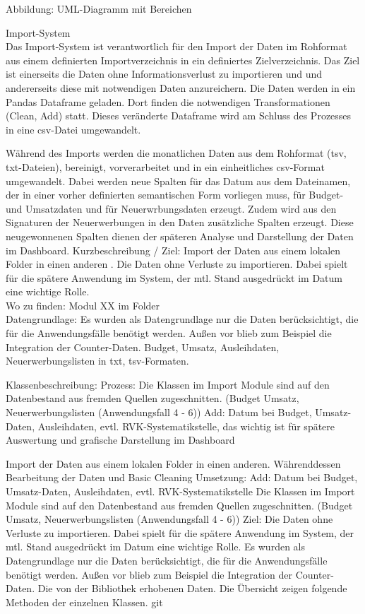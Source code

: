     Abbildung: UML-Diagramm mit Bereichen
    
    
    Import-System\\
    Das Import-System ist verantwortlich für den Import der Daten im Rohformat aus einem definierten Importverzeichnis in ein definiertes Zielverzeichnis. Das Ziel
    ist einerseits die Daten ohne Informationsverlust zu importieren und und andererseits diese mit notwendigen Daten anzureichern. Die Daten werden in ein Pandas Dataframe
    geladen. Dort finden die notwendigen Transformationen (Clean, Add) statt. Dieses veränderte Dataframe wird am Schluss des Prozesses in eine csv-Datei umgewandelt.
    
    
    Während des Imports werden 
    die monatlichen Daten aus dem Rohformat (tsv, txt-Dateien), bereinigt, vorverarbeitet und in ein einheitliches csv-Format umgewandelt. Dabei werden neue Spalten für das Datum aus dem Dateinamen, der in einer vorher definierten semantischen Form vorliegen muss, für Budget- und Umsatzdaten und für Neuerwrbungsdaten erzeugt. Zudem wird aus den Signaturen der Neuerwerbungen in den Daten zusätzliche Spalten erzeugt. Diese neugewonnenen Spalten dienen der späteren Analyse und Darstellung der Daten im Dashboard.
    Kurzbeschreibung / Ziel: Import der Daten aus einem lokalen Folder in einen anderen . 
    Die Daten ohne Verluste zu importieren. Dabei spielt für die spätere Anwendung im System, der mtl. Stand ausgedrückt im Datum eine wichtige Rolle.\\
    Wo zu finden: Modul XX im Folder \\
    Datengrundlage: Es wurden als Datengrundlage nur die Daten berücksichtigt, die für die Anwendungsfälle benötigt werden.
    Außen vor blieb zum Beispiel die Integration der Counter-Daten.
    Budget, Umsatz, Ausleihdaten, Neuerwerbungslisten in txt, tsv-Formaten.
 
 
 
 
 
 
 
 
 
 
    Klassenbeschreibung:
    Prozess: Die Klassen im Import Module sind auf den Datenbestand aus fremden Quellen zugeschnitten.
    (Budget Umsatz, Neuerwerbungslisten (Anwendungsfall 4 - 6))
    Add: Datum bei Budget, Umsatz-Daten, Ausleihdaten, evtl. RVK-Systematikstelle, das wichtig ist für spätere Auswertung und grafische Darstellung
    im Dashboard
  
  
    Import der Daten aus einem lokalen Folder in einen anderen. 
    Währenddessen Bearbeitung der Daten und Basic Cleaning
    Umsetzung:
    Add: Datum bei Budget, Umsatz-Daten, Ausleihdaten, evtl. RVK-Systematikstelle 
    Die Klassen im Import Module sind auf den Datenbestand aus fremden Quellen zugeschnitten.
    (Budget Umsatz, Neuerwerbungslisten (Anwendungsfall 4 - 6))
    Ziel: Die Daten ohne Verluste zu importieren. Dabei spielt für die spätere Anwendung im System, der mtl. Stand
    ausgedrückt im Datum eine wichtige Rolle.
    Es wurden als Datengrundlage nur die Daten berücksichtigt, die für die Anwendungsfälle benötigt werden.
    Außen vor blieb zum Beispiel die Integration der Counter-Daten.
    Die von der Bibliothek erhobenen Daten. Die Übersicht zeigen folgende Methoden der einzelnen Klassen.
    git
    


